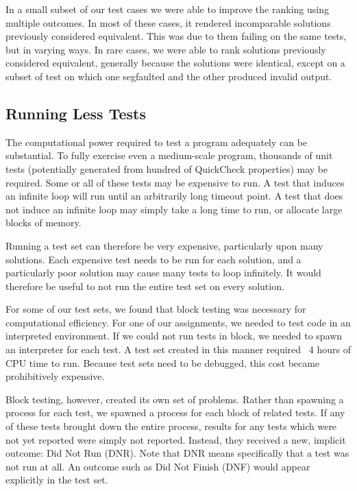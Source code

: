\documentclass[11pt,twoside]{article}
\theoremstyle{definition}
\begin{document}
In a small subset of our test cases
we were able to improve the ranking using multiple outcomes. In most of these cases, it rendered incomparable solutions previously considered equivalent. This was due to them failing on the same tests, but in varying ways. In rare cases, we were able to rank solutions previously considered equivalent, generally because the solutions were identical, except on a subset of test on which one segfaulted and the other produced invalid output.

\subsection{Running Less Tests}

The computational power required to test a program adequately can be substantial. To fully exercise even a medium-scale program, thousands of unit tests (potentially generated from hundred of QuickCheck properties) may be required. Some or all of these tests may be expensive to run. A test that induces an infinite loop will run until an arbitrarily long timeout point. A test that does not induce an infinite loop may simply take a long time to run, or allocate large blocks of memory.

Running a test set can therefore be very expensive, particularly upon many solutions. Each expensive test needs to be run for each solution, and a particularly poor solution may cause many tests to loop infinitely. It would therefore be useful to not run the entire test set on every solution. 

For some of our test sets, we found that block testing was necessary for computational efficiency. For one of our assignments, we needed to test code in an interpreted environment. If we could not run tests in block, we needed to spawn an interpreter for each test. A test set created in this manner required ~4 hours of CPU time to run. Because test sets need to be debugged, this cost became prohibitively expensive.

Block testing, however, created its own set of problems. Rather than spawning a process for each test, we spawned a process for each block of related tests. If any of these tests brought down the entire process, results for any tests which were not yet reported were simply not reported. Instead, they received a new, implicit outcome: Did Not Run (DNR). Note that DNR means specifically that a test was not run at all. An outcome such as Did Not Finish (DNF) would appear explicitly in the test set.
\end{document}
